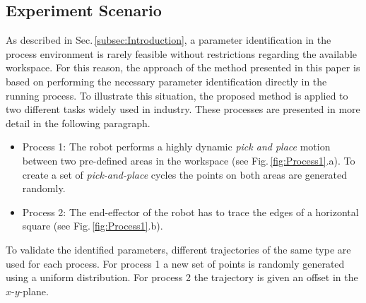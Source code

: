 
\subsection{Experiment Scenario}
\label{subsec:ExperimentScenario}

As described in Sec.\,\ref{subsec:Introduction}, a parameter identification in the process environment is rarely feasible without restrictions regarding the available workspace. For this reason, the approach of the method presented in this paper is based on performing the necessary parameter identification directly in the running process. To illustrate this situation, the proposed method is applied to two different tasks widely used in industry. These processes are presented in more detail in the following paragraph. 
\begin{itemize}
\item Process 1: The robot performs a highly dynamic \textit{pick and place} motion between two pre-defined areas in the workspace (see Fig.\,\ref{fig:Process1}.a). To create a set of \textit{pick-and-place} cycles the points on both areas are generated randomly.
\item Process 2: The end-effector of the robot has to trace the edges of a horizontal square (see Fig.\,\ref{fig:Process1}.b).
\end{itemize}
To validate the identified parameters, different trajectories of the same type are used for each process. For process 1 a new set of points is randomly generated using a uniform distribution. For process 2 the trajectory is given an offset in the $x$-$y$-plane.



